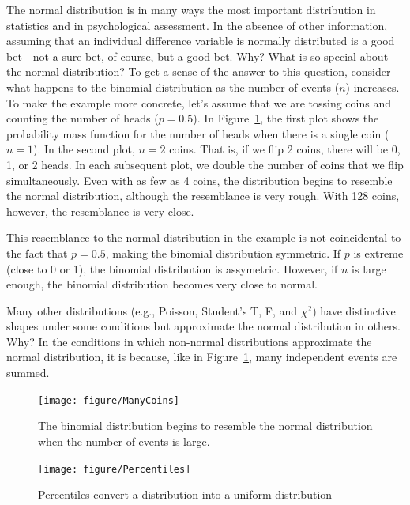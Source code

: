 \documentclass[nohyper,justified,marginals=raggedright]{tufte-book}\usepackage[]{graphicx}\usepackage[]{color}
\newenvironment{knitrout}{}{} %
\begin{document}
The normal distribution is in many ways the most important distribution in statistics and in psychological assessment. In the absence of other information, assuming that an individual difference variable is normally distributed is a good bet---not a sure bet, of course, but a good bet. Why? What is so special about the normal distribution? To get a sense of the answer to this question, consider what happens to the binomial distribution as the number of events ($n$) increases. To make the example more concrete, let's assume that we are tossing coins and counting the number of heads ($p=0.5$). In Figure~\ref{fig:ManyCoins}, the first plot shows the probability mass function for the number of heads when there is a single coin ($n=1$). In the second plot, $n=2$ coins. That is, if we flip 2 coins, there will be 0, 1, or 2 heads. In each subsequent plot, we double the number of coins that we flip simultaneously. Even with as few as 4 coins, the distribution begins to resemble the normal distribution, although the resemblance is very rough. With 128 coins, however, the resemblance is very close.

This resemblance to the normal distribution in the example is not coincidental to the fact that $p=0.5$, making the binomial distribution symmetric. If $p$ is extreme (close to 0 or 1), the binomial distribution is assymetric. However, if $n$ is large enough, the binomial distribution becomes very close to normal.

Many other distributions (e.g., Poisson, Student's T, F, and $\chi^2$) have distinctive shapes under some conditions but approximate the normal distribution in others. Why? In the conditions in which non-normal distributions approximate the normal distribution, it is because, like in Figure~\ref{fig:ManyCoins}, many independent events are summed.



\begin{figure}
\centering
\begin{knitrout}
\color{fgcolor}
\texttt{[image: figure/ManyCoins]} 

\end{knitrout}
\caption{The binomial distribution begins to resemble the normal distribution when the number of events is large.}
\label{fig:ManyCoins}
\end{figure}

\begin{figure}
\centering
\begin{knitrout}
\color{fgcolor}
\texttt{[image: figure/Percentiles]} 

\end{knitrout}
\caption{Percentiles convert a distribution into a uniform distribution}
\label{fig:PercentileContinuous}
\end{figure}
\end{document}
